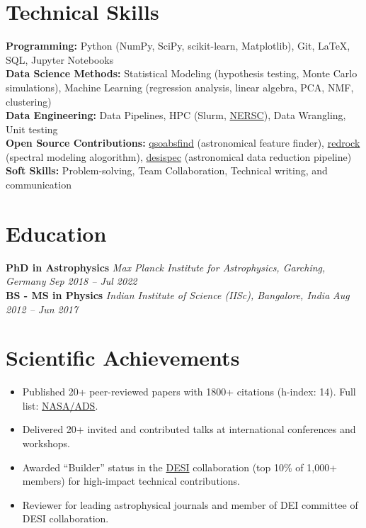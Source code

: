 \documentclass[a4paper,10pt]{article}
\begin{document}
\vspace*{-4mm}
\section*{Technical Skills}
\textcolor{sectionblue}{\textbf{Programming:}} Python (NumPy, SciPy, scikit-learn, Matplotlib), Git, LaTeX, SQL, Jupyter Notebooks \\
\textcolor{sectionblue}{\textbf{Data Science Methods:}} Statistical Modeling (hypothesis testing, Monte Carlo simulations), Machine Learning (regression analysis, linear algebra, PCA, NMF, clustering)\\
\textcolor{sectionblue}{\textbf{Data Engineering:}} Data Pipelines, HPC (Slurm, \href{https://www.nersc.gov}{NERSC}), Data Wrangling, Unit testing\\
\textcolor{sectionblue}{\textbf{Open Source Contributions:}} \href{https://github.com/abhi0395/qsoabsfind}{qsoabsfind} (astronomical feature finder), \href{https://github.com/desihub/redrock}{redrock} (spectral modeling alogorithm), \href{https://github.com/desihub/desispec}{desispec} (astronomical data reduction pipeline)\\
\textcolor{sectionblue}{\textbf{Soft Skills:}} Problem-solving, Team Collaboration, Technical writing, and communication
\vspace*{-2mm}

\section*{Education}

\textcolor{sectionblue}{\textbf{PhD in Astrophysics}} \hfill \textit{Max Planck Institute for Astrophysics, Garching, Germany} \hfill \textit{Sep 2018 – Jul 2022}\\
\textcolor{sectionblue}{\textbf{BS - MS in Physics}} \hfill \textit{Indian Institute of Science (IISc), Bangalore, India} \hfill \textit{Aug 2012 – Jun 2017}
\vspace*{-2mm}

\section*{Scientific Achievements}
\begin{itemize}
    \item Published 20+ peer-reviewed papers with 1800+ citations (h-index: 14). Full list: \href{https://ui.adsabs.harvard.edu/public-libraries/YPXGQEsNQg-zR9R9YBYFXw}{NASA/ADS}.
    \vspace*{-1mm}
    \item Delivered 20+ invited and contributed talks at international conferences and workshops.
    \vspace*{-1mm}
    \item Awarded “Builder” status in the \href{https://en.wikipedia.org/wiki/Dark_Energy_Spectroscopic_Instrument}{DESI} collaboration (top 10\% of 1,000+ members) for high-impact technical contributions.
    \vspace*{-1mm}
    \item Reviewer for leading astrophysical journals and member of DEI committee of DESI collaboration.
\end{itemize}
\end{document}

